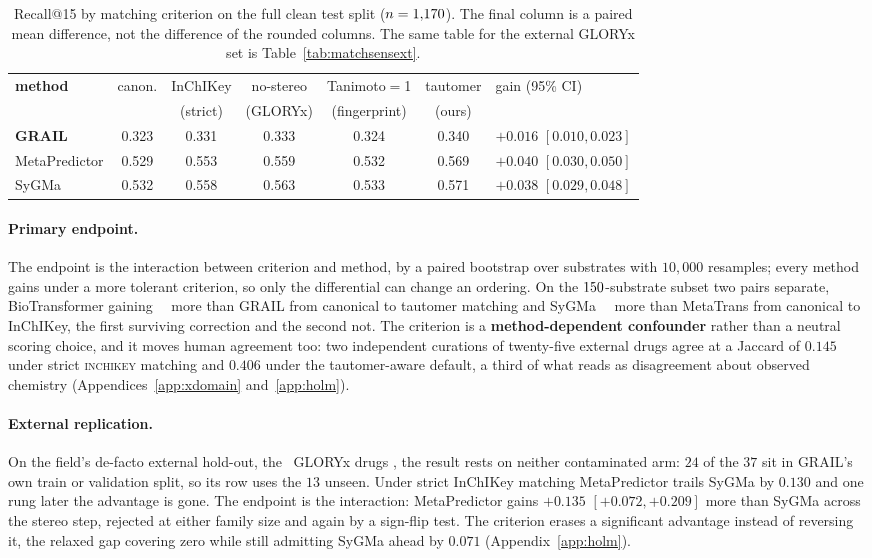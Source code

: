 \begin{table}[tb]
\caption{Recall@15 by matching criterion on the full clean test split ($n=1{,}170$). The final column
is a paired mean difference, not the difference of the rounded columns. The same table for the
external GLORYx set is Table~\ref{tab:matchsensext}.}
\label{tab:matchsens}
\centering
\begin{tabular}{lccccc l}
\toprule
\textbf{method} & canon. & InChIKey & no-stereo & Tanimoto$=$1 & tautomer & gain (95\% CI) \\
 & & (strict) & (GLORYx) & (fingerprint) & (ours) & \\
\midrule
\textbf{GRAIL} & 0.323 & 0.331 & 0.333 & 0.324 & 0.340 & $+0.016$ $[0.010,0.023]$ \\
MetaPredictor  & 0.529 & 0.553 & 0.559 & 0.532 & 0.569 & $+0.040$ $[0.030,0.050]$ \\
SyGMa          & 0.532 & 0.558 & 0.563 & 0.533 & 0.571 & $+0.038$ $[0.029,0.048]$ \\
\bottomrule
\end{tabular}
\end{table}

\paragraph{Primary endpoint.} The endpoint is the interaction between criterion and method, by a
paired bootstrap over substrates with $10{,}000$ resamples; every method gains under a more tolerant
criterion, so only the differential can change an ordering. On the $150$-substrate subset two
pairs separate, BioTransformer gaining \interA\ \interAci\ more than GRAIL from canonical to
tautomer matching and SyGMa \interB\ \interBci\ more than MetaTrans from canonical to InChIKey,
the first surviving correction and the second not. The criterion is a \textbf{method-dependent
confounder} rather than a neutral scoring choice, and it moves human agreement too: two independent
curations of twenty-five external drugs agree at a Jaccard of $0.145$ under strict
\textsc{inchikey} matching and $0.406$ under the tautomer-aware default, a third of what reads as
disagreement about observed chemistry (Appendices~\ref{app:xdomain} and~\ref{app:holm}).

\paragraph{External replication.} On the field's de-facto external hold-out, the \nglory\ GLORYx
drugs \citep{de_Bruyn_Kops_2020}, the result rests on neither contaminated arm: $24$ of the $37$ sit
in GRAIL's own train or validation split, so its row uses the $13$ unseen. Under strict InChIKey
matching MetaPredictor trails SyGMa by $0.130$ and one rung later the advantage is gone. The
endpoint is the interaction: MetaPredictor gains $+0.135$ $[+0.072,+0.209]$ more than SyGMa across
the stereo step, rejected at either family size and again by a sign-flip test. The criterion erases
a significant advantage instead of reversing it, the relaxed gap covering zero while still admitting
SyGMa ahead by $0.071$ (Appendix~\ref{app:holm}).





